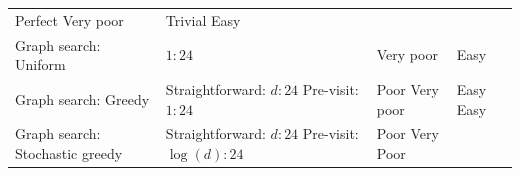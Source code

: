 \documentclass[10pt,oneside]{memoir}
\begin{document}
\begin{longtable}[]{@{}llll@{}}
\begin{minipage}[t]{0.11\columnwidth}
Perfect \linebreak Very poor\strut
\end{minipage} & \begin{minipage}[t]{0.19\columnwidth}\raggedright
Trivial \linebreak Easy\strut
\end{minipage}\tabularnewline
\begin{minipage}[t]{0.23\columnwidth}\raggedright
Graph search: Uniform\strut
\end{minipage} & \begin{minipage}[t]{0.35\columnwidth}\raggedright
\(1 : 24\)\strut
\end{minipage} & \begin{minipage}[t]{0.11\columnwidth}\raggedright
Very poor\strut
\end{minipage} & \begin{minipage}[t]{0.19\columnwidth}\raggedright
Easy\strut
\end{minipage}\tabularnewline
\begin{minipage}[t]{0.23\columnwidth}\raggedright
Graph search: Greedy\strut
\end{minipage} & \begin{minipage}[t]{0.35\columnwidth}\raggedright
Straightforward: \(d : 24\) \linebreak Pre-visit: \(1:24\)\strut
\end{minipage} & \begin{minipage}[t]{0.11\columnwidth}\raggedright
Poor \linebreak Very poor\strut
\end{minipage} & \begin{minipage}[t]{0.19\columnwidth}\raggedright
Easy \linebreak Easy\strut
\end{minipage}\tabularnewline
\begin{minipage}[t]{0.23\columnwidth}\raggedright
Graph search: Stochastic greedy\strut
\end{minipage} & \begin{minipage}[t]{0.35\columnwidth}\raggedright
Straightforward: \(d : 24\) \linebreak Pre-visit: \(\log(d) : 24\)\strut
\end{minipage} & \begin{minipage}[t]{0.11\columnwidth}\raggedright
Poor \linebreak Very Poor\strut
\end{minipage} & \begin{minipage}[t]{0.19\columnwidth}\raggedright

\end{minipage}
\end{longtable}
\end{document}
